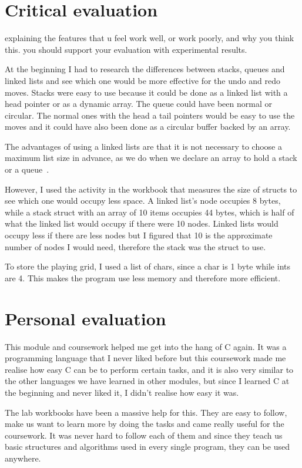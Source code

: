 \documentclass[10pt, a4paper]{article}
\begin{document}
	\section{Critical evaluation}
explaining the features that u feel work well, or work poorly, and why you think this. you should support your evaluation with experimental results.

At the beginning I had to research the differences between stacks, queues and linked lists and see which one would be more effective for the undo and redo moves. Stacks were easy to use because it could be done as a linked list with a head pointer or as a dynamic array. The queue could have been normal or circular. The normal ones with the head a tail pointers would be easy to use the moves and it could have also been done as a circular buffer backed by an array.

The advantages of using a linked lists are that it is not necessary to choose a maximum list size in advance, as we do when we declare an array to hold a stack or a queue~\cite{storer_2013}.

However, I used the activity in the workbook that measures the size of structs to see which one would occupy less space. A linked list's node occupies 8 bytes, while a stack struct with an array of 10 items occupies 44 bytes, which is half of what the linked list would occupy if there were 10 nodes. Linked lists would occupy less if there are less nodes but I figured that 10 is the approximate number of nodes I would need, therefore the stack was the struct to use.

To store the playing grid, I used a list of chars, since a char is 1 byte while ints are 4. This makes the program use less memory and therefore more efficient.

    \section{Personal evaluation}

This module and coursework helped me get into the hang of C again. It was a programming language that I never liked before but this coursework made me realise how easy C can be to perform certain tasks, and it is also very similar to the other languages we have learned in other modules, but since I learned C at the beginning and never liked it, I didn't realise how easy it was.

The lab workbooks have been a massive help for this. They are easy to follow, make us want to learn more by doing the tasks and came really useful for the coursework. It was never hard to follow each of them and since they teach us basic structures and algorithms used in every single program, they can be used anywhere.
\end{document}
